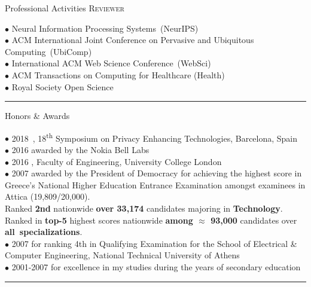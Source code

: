\documentclass[11pt]{resume}
\begin{document}
\begin{category}{Professional Activities}
\citemnobullet
\textsc{Reviewer}

$\bullet$ Neural Information Processing Systems~(NeurIPS)\\
$\bullet$ ACM International Joint Conference on Pervasive and Ubiquitous \mbox{Computing~(UbiComp)}\\
$\bullet$ International ACM Web Science Conference~(WebSci)\\
$\bullet$ ACM Transactions on Computing for Healthcare (Health)\\
$\bullet$  Royal Society Open Science

\noindent\rule{\textwidth}{0.2pt}
\end{category}


\newcommand{\ts}{\textsuperscript}



\begin{category}{Honors \& Awards}

$\bullet$ 2018~, 18\ts{th} Symposium on Privacy Enhancing Technologies, Barcelona, Spain \\

$\bullet$ 2016  awarded by the Nokia Bell Labs  \\

$\bullet$ 2016 , Faculty of Engineering, University College London \\

$\bullet$ 2007  awarded by the President of Democracy for achieving the highest score in Greece's National
Higher Education Entrance Examination amongst examinees in Attica (19,809/20,000).\\ 
Ranked \textbf{2nd} nationwide \textbf{over 33,174} candidates majoring in \textbf{Technology}.\\ 
Ranked in \textbf{top-5} highest scores nationwide \textbf{among $\approx$ 93,000} candidates over \mbox{\textbf{all specializations}}.\\

$\bullet$ 2007  for ranking 4th in Qualifying Examination
for the School of Electrical \& Computer Engineering, National Technical University of Athens \\

$\bullet$ 2001-2007  for excellence in my studies during the years of secondary education \\

\noindent\rule{\textwidth}{0.2pt}
\end{category}
\end{document}
